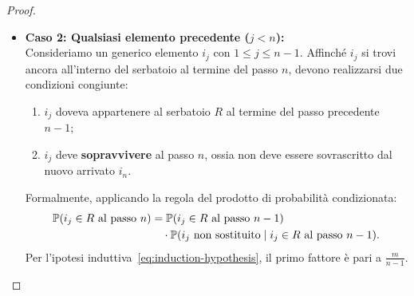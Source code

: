 \begin{proof}
\begin{itemize}
  \item \textbf{Caso 2: Qualsiasi elemento precedente ($j < n$):}\\
  Consideriamo un generico elemento $i_j$ con $1 \le j \le n - 1$. Affinché $i_j$ si trovi ancora all'interno del serbatoio al termine del passo $n$, devono realizzarsi due condizioni congiunte:
  \begin{enumerate}
    \item $i_j$ doveva appartenere al serbatoio $R$ al termine del passo precedente $n - 1$;
    \item $i_j$ deve \textbf{sopravvivere} al passo $n$, ossia non deve essere sovrascritto dal nuovo arrivato $i_n$.
  \end{enumerate}
  Formalmente, applicando la regola del prodotto di probabilità condizionata:
  \begin{align}
    \mathbb{P}(i_j \in R \text{ al passo } n) &= \mathbb{P}(i_j \in R \text{ al passo } n - 1) \notag\\
    &\quad \cdot \mathbb{P}(i_j \text{ non sostituito} \mid i_j \in R \text{ al passo } n - 1).
  \end{align}
  Per l'ipotesi induttiva~\eqref{eq:induction-hypothesis}, il primo fattore è pari a $\frac{m}{n - 1}$.


\end{itemize}
\end{proof}
